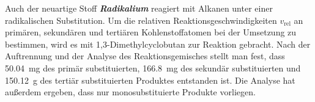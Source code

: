 \documentclass[../kl11.tex]{subfiles}
\begin{document}
Auch der neuartige Stoff \textit{\textbf{Radikalium}} reagiert mit Alkanen unter einer radikalischen Substitution. Um die relativen Reaktionsgeschwindigkeiten $v_{\mathrm{rel}}$ an primären, sekundären und tertiären Kohlenstoffatomen bei der Umsetzung zu bestimmen, wird es mit 1,3-Dimethylcyclobutan zur Reaktion gebracht. Nach der Auftrennung und der Analyse des Reaktionsgemisches stellt man fest, dass \SI{50,04}{\milli\gram} des primär substituierten, \SI{166,8}{\milli\gram} des sekundär substituierten und \SI{150,12}{\gram} des tertiär substituierten Produktes entstanden ist. Die Analyse hat außerdem ergeben, dass nur monosubstituierte Produkte vorliegen.



\end{document}
